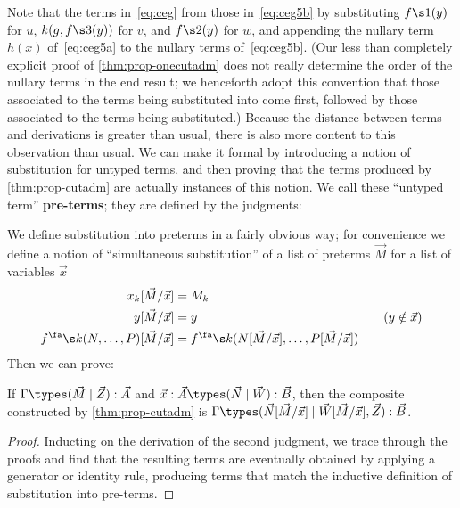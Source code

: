 Note that the terms in~\eqref{eq:ceg} from those in~\eqref{eq:ceg5b} by substituting $f\s1(y)$ for $u$, $k(g,f\s3(y))$ for $v$, and $f\s2(y)$ for $w$, and appending the nullary term $h(x)$ of~\eqref{eq:ceg5a} to the nullary terms of~\eqref{eq:ceg5b}.
(Our less than completely explicit proof of \cref{thm:prop-onecutadm} does not really determine the order of the nullary terms in the end result; we henceforth adopt this convention that those associated to the terms being substituted into come first, followed by those associated to the terms being substituted.)
Because the distance between terms and derivations is greater than usual, there is also more content to this observation than usual.
We can make it formal by introducing a notion of substitution for untyped terms, and then proving that the terms produced by \cref{thm:prop-cutadm} are actually instances of this notion.
We call these ``untyped term'' \textbf{pre-terms}; they are defined by the judgments:
We define substitution into preterms in a fairly obvious way; for convenience we define a notion of ``simultaneous substitution'' of a list of preterms $\vec M$ for a list of variables $\vec x$
\begin{alignat*}{2}
  x_k[\vec M/\vec x] &= M_k\\
  y[\vec M/\vec x] &= y &\quad (y\notin \vec x)\\
  f^\fa\s k(N,\dots,P)[\vec M/\vec x] &= f^\fa\s k(N[\vec M/\vec x],\dots,P[\vec M/\vec x])
\end{alignat*}
Then we can prove:

\begin{lem}\label{thm:prop-cutissub}
  If $\Gamma \types (\vec M\mid \vec Z):\vec A$ and $\vec x:\vec A \types (\vec N\mid \vec W):\vec B$, then the composite constructed by \cref{thm:prop-cutadm} is $\Gamma \types (\vec N[\vec M/\vec x]\mid \vec W[\vec M/\vec x],\vec Z):\vec B$.
\end{lem}
\begin{proof}
  Inducting on the derivation of the second judgment, we trace through the proofs and find that the resulting terms are eventually obtained by applying a generator or identity rule, producing terms that match the inductive definition of substitution into pre-terms.
\end{proof}

